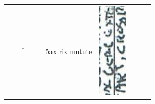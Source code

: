 \documentclass[10pt]{article}
\begin{document}
\begin{center}
\begin{tabular}{|c|c|c|c|c|c|c|c|c|c|}
 &  & \({ }^{*}\) &  &  & 5ax rix mutute & \includegraphics[max width=\textwidth]{2025_02_27_dd68c3d38de88f0516d9g-096}

\end{tabular}
\end{center}
\end{document}
